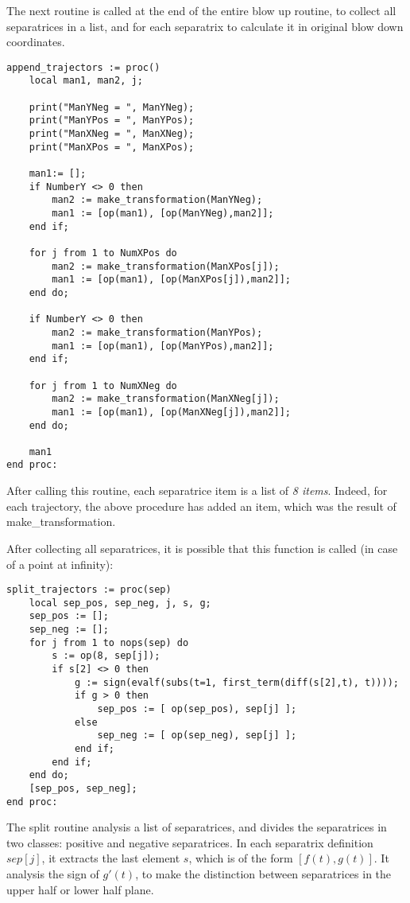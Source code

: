 \documentclass[a4paper,10pt]{article}
\begin{document}
The next routine is called at the end of the entire blow up routine, to collect all separatrices in a list,
and for each separatrix to calculate it in original blow down coordinates.

\begin{lstlisting}[name=blowup]
append_trajectors := proc()
    local man1, man2, j;

    print("ManYNeg = ", ManYNeg);
    print("ManYPos = ", ManYPos);
    print("ManXNeg = ", ManXNeg);
    print("ManXPos = ", ManXPos);

    man1:= [];
    if NumberY <> 0 then
        man2 := make_transformation(ManYNeg);
        man1 := [op(man1), [op(ManYNeg),man2]];
    end if;

    for j from 1 to NumXPos do
        man2 := make_transformation(ManXPos[j]);
        man1 := [op(man1), [op(ManXPos[j]),man2]];
    end do;

    if NumberY <> 0 then
        man2 := make_transformation(ManYPos);
        man1 := [op(man1), [op(ManYPos),man2]];
    end if;

    for j from 1 to NumXNeg do
        man2 := make_transformation(ManXNeg[j]);
        man1 := [op(man1), [op(ManXNeg[j]),man2]];
    end do;

    man1
end proc:
\end{lstlisting}

After calling this routine, each separatrice item is a list of \emph{8 items}.  Indeed, for
each trajectory, the above procedure has added an item, which was the result of make\_transformation.
\medskip

After collecting all separatrices, it is possible that this function is called (in case of a point at
infinity):

\begin{lstlisting}[name=blowup]
split_trajectors := proc(sep)
    local sep_pos, sep_neg, j, s, g;
    sep_pos := [];
    sep_neg := [];
    for j from 1 to nops(sep) do
        s := op(8, sep[j]);
        if s[2] <> 0 then
            g := sign(evalf(subs(t=1, first_term(diff(s[2],t), t))));
            if g > 0 then
                sep_pos := [ op(sep_pos), sep[j] ];
            else
                sep_neg := [ op(sep_neg), sep[j] ];
            end if;
        end if;
    end do;
    [sep_pos, sep_neg];
end proc:
\end{lstlisting}
The split routine analysis a list of separatrices, and divides the separatrices in two classes:
positive and negative separatrices.  In each separatrix definition $sep[j]$, it extracts
the last element $s$, which is of the form $[f(t),g(t)]$.  It analysis the sign of $g'(t)$, to make
the distinction between separatrices in the upper half or lower half plane.
\medskip
\end{document}
